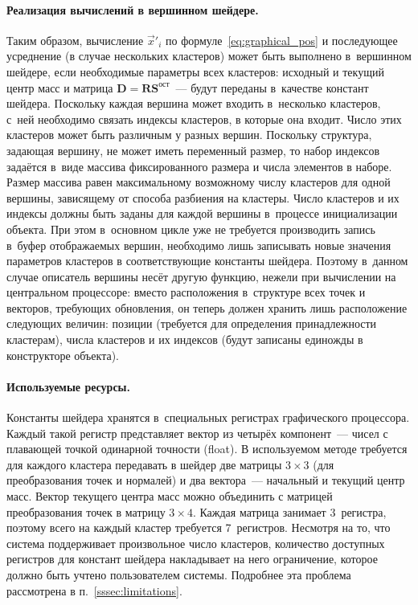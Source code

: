 \documentclass[a4paper, 14pt, titlepage]{extarticle}
\newcommand{\vect}[1]{\vec{#1}} %
\newcommand{\matx}[1]{\mathbf{#1}} %
\begin{document}
        \paragraph{Реализация вычислений в вершинном шейдере.}
        Таким образом, вычисление $\vect{x}'_i$ по формуле~\eqref{eq:graphical_pos} и последующее
        усреднение (в случае нескольких кластеров) может быть выполнено в~вершинном шейдере, если
        необходимые параметры всех кластеров: исходный и текущий центр масс и матрица $\matx D =
        \matx{R} \matx{S}^{ост}$~--- будут переданы в~качестве констант шейдера. Поскольку каждая
        вершина может входить в~несколько кластеров, с~ней необходимо связать индексы кластеров, в
        которые она входит. Число этих кластеров может быть различным у разных вершин. Поскольку
        структура, задающая вершину, не может иметь переменный размер, то набор индексов задаётся
        в~виде массива фиксированного размера и числа элементов в наборе. Размер массива равен
        максимальному возможному числу кластеров для одной вершины, зависящему от способа разбиения
        на кластеры. Число кластеров и их индексы должны быть заданы для каждой вершины в~процессе
        инициализации объекта. При этом в~основном цикле уже не требуется
        производить запись в~буфер отображаемых вершин, необходимо лишь записывать новые значения
        параметров кластеров в соответствующие константы шейдера. Поэтому в~данном случае описатель
        вершины несёт другую функцию, нежели при вычислении на центральном процессоре: вместо
        расположения в~структуре всех точек и векторов, требующих обновления, он теперь должен
        хранить лишь расположение следующих величин: позиции (требуется для определения
        принадлежности кластерам), числа кластеров и их индексов (будут записаны единожды в
        конструкторе объекта).

        \paragraph{Используемые ресурсы.}
        Константы шейдера хранятся в~специальных регистрах графического процессора. Каждый такой регистр
        представляет вектор из четырёх компонент~--- чисел с плавающей точкой одинарной точности
        (float). В используемом методе требуется для каждого
        кластера передавать в шейдер две матрицы $3 \times 3$ (для преобразования точек и нормалей) и два
        вектора~--- начальный и текущий центр масс. Вектор текущего центра масс можно объединить с
        матрицей преобразования точек в матрицу $3 \times 4$. Каждая матрица занимает 3~регистра,
        поэтому всего на каждый кластер требуется 7~регистров. Несмотря на то, что система
        поддерживает произвольное число кластеров, количество доступных регистров для констант
        шейдера накладывает на него ограничение, которое должно быть учтено пользователем системы.
        Подробнее эта проблема рассмотрена в п.~\ref{sssec:limitations}.
\end{document}
